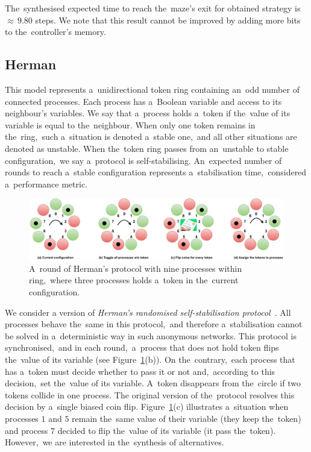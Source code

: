 The~synthesised expected time to reach the~maze's exit for obtained strategy is ${\approx} \, 9.80$ steps. 
We note that this result cannot be improved by adding more bits to the~controller's memory.

\subsection{Herman} \label{sec:herman}
This model represents a~unidirectional token ring containing an~odd number of connected processes.
Each process has a~Boolean variable and access to its neighbour's variables.
We say that a~process holds a~token if the~value of its variable is equal to the~neighbour.
When only one token remains in the~ring,~such a~situation is denoted a~stable one,~and all other situations are denoted as unstable.
When the~token ring passes from an~unstable to stable configuration,~we say a~protocol is self-stabilising.
An~expected number of rounds to reach a~stable configuration represents a~stabilisation time,~considered a~performance metric.

\begin{figure}[h!]
\centering
\includegraphics[width=1.0\textwidth]{figures/herman_coins.pdf}
\caption{A~round of Herman's protocol with nine processes within ring,~where three processes holds a~token in the~current configuration.}%
\label{fig:herman}%
\end{figure}

We consider a version of \textit{Herman's randomised self-stabilisation protocol}~\cite{herman1,herman2}.
All processes behave the~same in this protocol,~and therefore a~stabilisation cannot be solved in a~deterministic way in such anonymous networks.
This protocol is synchronised,~and in each round,~a~process that does not hold token flips the~value of its variable (see Figure~\ref{fig:herman}(b)).
On the~contrary,~each process that has a~token must decide whether to pass it or not and,~according to this decision,~set the~value of its variable.
A~token disappears from the~circle if two tokens collide in one process.
The original version of the~protocol resolves this decision by a~single biased coin flip.
Figure~\ref{fig:herman}(c) illustrates a~situation when processes $1$ and $5$ remain the~same value of their variable (they keep the~token) and process $7$ decided to flip the~value of its variable (it pass the~token).
However,~we are interested in the~synthesis of alternatives.

